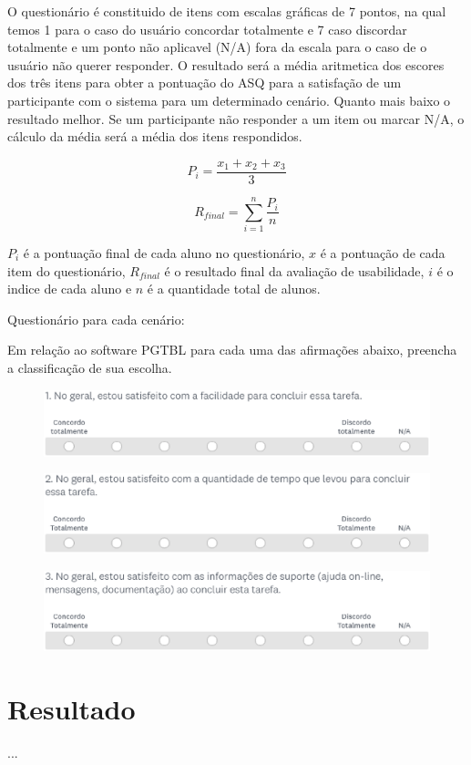 O questionário é constituido de itens com escalas gráficas de 7 pontos, na qual temos 1 para o caso do usuário concordar
totalmente e 7 caso discordar totalmente e um ponto não aplicavel (N/A) fora da escala para o caso de o usuário não
querer responder. O resultado será a média aritmetica dos escores dos três itens para obter a pontuação do ASQ para a
satisfação de um participante com o sistema para um determinado cenário. Quanto mais baixo o resultado melhor. Se um
participante não responder a um item ou marcar N/A, o cálculo da média será a média dos itens respondidos.

$$P_{i} = \frac{x_{1} + x_{2} + x_{3}}{3}$$

$$R_{final} = \sum_{i=1}^{n} \frac{P_{i}}{n}$$

$P_i$ é a pontuação final de cada aluno no questionário, $x$ é a pontuação de cada item do questionário, $R_{final}$ é o resultado final da avaliação de usabilidade,
$i$ é o indice de cada aluno e $n$ é a quantidade total de alunos.

Questionário para cada cenário:

Em relação ao software PGTBL para cada uma das afirmações abaixo, preencha a classificação de sua escolha.

\begin{figure}[h!]
  \centering
  \includegraphics[keepaspectratio=true,scale=0.6]{figuras/p1.eps}
\end{figure}

\begin{figure}[h!]
  \centering
  \includegraphics[keepaspectratio=true,scale=0.6]{figuras/p2.eps}
\end{figure}

\begin{figure}[h!]
  \centering
  \includegraphics[keepaspectratio=true,scale=0.6]{figuras/p3.eps}
\end{figure}

\section{Resultado}

...

